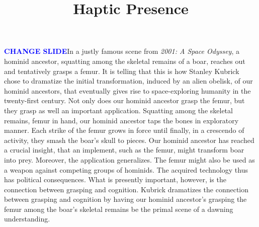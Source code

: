 \documentclass[12pt]{article}
\title{Haptic Presence}
\author{\myauthor}
\date{} %
\newcommand{\change}{\textcolor{blue}{\textbf{CHANGE SLIDE}}}
\begin{document}
\maketitle

\setlength{\parindent}{1em}


\change In a justly famous scene from \emph{2001: A Space Odyssey}, a hominid ancestor, squatting among the skeletal remains of a boar, reaches out and tentatively grasps a femur. It is telling that this is how Stanley Kubrick chose to dramatize the initial transformation, induced by an alien obelisk, of our hominid ancestors, that eventually gives rise to space-exploring humanity in the twenty-first century. Not only does our hominid ancestor grasp the femur, but they grasp as well an important application. Squatting among the skeletal remains, femur in hand, our hominid ancestor taps the bones in exploratory manner. Each strike of the femur grows in force until finally, in a crescendo of activity, they smash the boar's skull to pieces. Our hominid ancestor has reached a crucial insight, that an implement, such as the femur, might transform boar into prey. Moreover, the application generalizes. The femur might also be used as a weapon against competing groups of hominids. The acquired technology thus has political consequences. What is presently important, however, is the connection between grasping and cognition. Kubrick dramatizes the connection between grasping and cognition by having our hominid ancestor's grasping the femur among the boar's skeletal remains be the primal scene of a dawning understanding.
\end{document}
